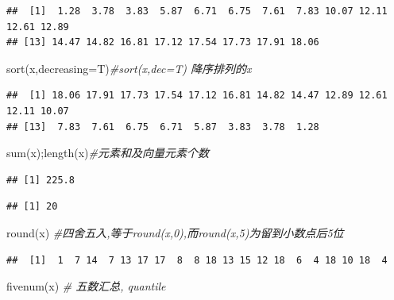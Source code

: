 \documentclass[
]{book}
\newenvironment{Shaded}{\begin{snugshade}}{\end{snugshade}}
\newcommand{\AttributeTok}[1]{\textcolor[rgb]{0.77,0.63,0.00}{#1}}
\newcommand{\CommentTok}[1]{\textcolor[rgb]{0.56,0.35,0.01}{\textit{#1}}}
\newcommand{\FunctionTok}[1]{\textcolor[rgb]{0.00,0.00,0.00}{#1}}
\newcommand{\NormalTok}[1]{#1}
\begin{document}
\begin{verbatim}
##  [1]  1.28  3.78  3.83  5.87  6.71  6.75  7.61  7.83 10.07 12.11 12.61 12.89
## [13] 14.47 14.82 16.81 17.12 17.54 17.73 17.91 18.06
\end{verbatim}

\begin{Shaded}
\begin{Highlighting}[]
\FunctionTok{sort}\NormalTok{(x,}\AttributeTok{decreasing=}\NormalTok{T)}\CommentTok{\#sort(x,dec=T) 降序排列的x}
\end{Highlighting}
\end{Shaded}

\begin{verbatim}
##  [1] 18.06 17.91 17.73 17.54 17.12 16.81 14.82 14.47 12.89 12.61 12.11 10.07
## [13]  7.83  7.61  6.75  6.71  5.87  3.83  3.78  1.28
\end{verbatim}

\begin{Shaded}
\begin{Highlighting}[]
\FunctionTok{sum}\NormalTok{(x);}\FunctionTok{length}\NormalTok{(x)}\CommentTok{\#元素和及向量元素个数}
\end{Highlighting}
\end{Shaded}

\begin{verbatim}
## [1] 225.8
\end{verbatim}

\begin{verbatim}
## [1] 20
\end{verbatim}

\begin{Shaded}
\begin{Highlighting}[]
\FunctionTok{round}\NormalTok{(x) }\CommentTok{\#四舍五入,等于round(x,0),而round(x,5)为留到小数点后5位}
\end{Highlighting}
\end{Shaded}

\begin{verbatim}
##  [1]  1  7 14  7 13 17 17  8  8 18 13 15 12 18  6  4 18 10 18  4
\end{verbatim}

\begin{Shaded}
\begin{Highlighting}[]
\FunctionTok{fivenum}\NormalTok{(x)  }\CommentTok{\# 五数汇总, quantile}
\end{Highlighting}
\end{Shaded}
\end{document}
